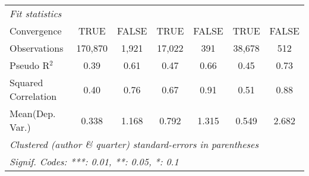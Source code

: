 \begin{tabular}{lcccccc}
   \midrule
   \emph{Fit statistics}\\
   Convergence                                                &TRUE          & FALSE         & TRUE          & FALSE         & TRUE        & FALSE\\  
   Observations                                               & 170,870      & 1,921         & 17,022        & 391           & 38,678      & 512\\  
   Pseudo R$^2$                                               & 0.39         & 0.61          & 0.47          & 0.66          & 0.45        & 0.73\\  
   Squared Correlation                                        & 0.40         & 0.76          & 0.67          & 0.91          & 0.51        & 0.88\\  
Mean(Dep. Var.) & 0.338 & 1.168 & 0.792 & 1.315 & 0.549 & 2.682 \\
   \midrule \midrule
   \multicolumn{7}{l}{\emph{Clustered (author \& quarter) standard-errors in parentheses}}\\
   \multicolumn{7}{l}{\emph{Signif. Codes: ***: 0.01, **: 0.05, *: 0.1}}\\
\end{tabular}
\par\endgroup
